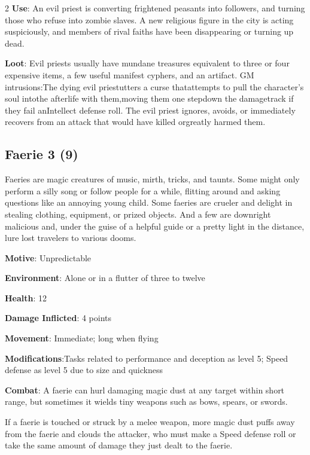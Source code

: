 \begin{multicols}{2}
\textbf{Use}: An evil priest is converting frightened peasants into followers, and turning those who refuse into zombie slaves. A new religious figure in the city is acting suspiciously, and members of rival faiths have been disappearing or turning up dead. 

\textbf{Loot}: Evil priests usually have mundane treasures equivalent to three or four expensive items, a few useful manifest cyphers, and an artifact.
GM intrusions:The dying evil priestutters a curse thatattempts to pull the character’s soul intothe afterlife with them,moving them one stepdown the damagetrack if they fail anIntellect defense roll.
The evil priest ignores, avoids, or immediately recovers from an attack that would have killed orgreatly harmed them.

\subsection{Faerie 3 (9)}

Faeries are magic creatures of music, mirth, tricks, and taunts. Some might only perform a silly song or follow people for a while, flitting around and asking questions like an annoying young child. Some faeries are crueler and delight in stealing clothing, equipment, or prized objects. And a few are downright malicious and, under the guise of a helpful guide or a pretty light in the distance, lure lost travelers to various dooms. 

\textbf{Motive}: Unpredictable 

\textbf{Environment}: Alone or in a flutter of three to twelve 

\textbf{Health}: 12 

\textbf{Damage Inflicted}: 4 points 

\textbf{Movement}: Immediate; long when flying 

\textbf{Modifications}:Tasks related to performance and deception as level 5; Speed defense as level 5 due to size and quickness 

\textbf{Combat}: A faerie can hurl damaging magic dust at any target within short range, but sometimes it wields tiny weapons such as bows, spears, or swords. 

If a faerie is touched or struck by a melee weapon, more magic dust puffs away from the faerie and clouds the attacker, who must make a Speed defense roll or take the same amount of damage they just dealt to the faerie. 


\end{multicols}
